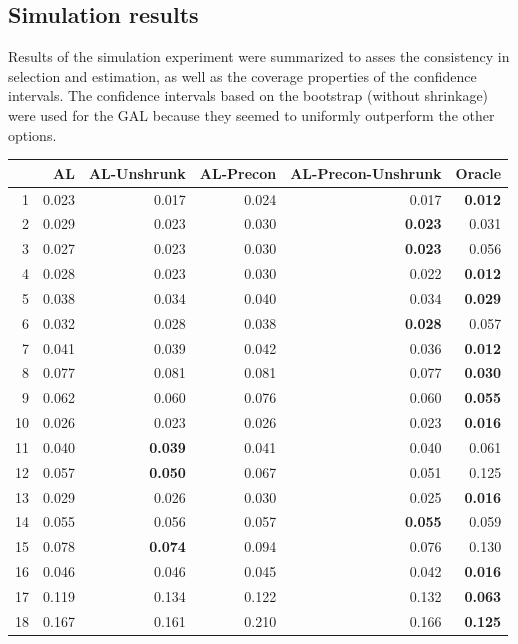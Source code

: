\documentclass[authoryear, review, 11pt]{elsarticle}
\begin{document}
	\subsection{Simulation results}
	Results of the simulation experiment were summarized to asses the consistency in selection and estimation, as well as the coverage properties of the confidence intervals. The confidence intervals based on the bootstrap (without shrinkage) were used for the GAL because they seemed to uniformly outperform the other options.\\
	
\begin{table}[ht]
\centering
\begin{tabular}{rrrrrr}
  \hline
 & AL & AL-Unshrunk & AL-Precon & AL-Precon-Unshrunk & Oracle \\ 
  \hline
1 & 0.023 & 0.017 & 0.024 & 0.017 & \textbf{0.012} \\ 
  2 & 0.029 & 0.023 & 0.030 & \textbf{0.023} & 0.031 \\ 
  3 & 0.027 & 0.023 & 0.030 & \textbf{0.023} & 0.056 \\ 
  4 & 0.028 & 0.023 & 0.030 & 0.022 & \textbf{0.012} \\ 
  5 & 0.038 & 0.034 & 0.040 & 0.034 & \textbf{0.029} \\ 
  6 & 0.032 & 0.028 & 0.038 & \textbf{0.028} & 0.057 \\ 
  7 & 0.041 & 0.039 & 0.042 & 0.036 & \textbf{0.012} \\ 
  8 & 0.077 & 0.081 & 0.081 & 0.077 & \textbf{0.030} \\ 
  9 & 0.062 & 0.060 & 0.076 & 0.060 & \textbf{0.055} \\ 
  10 & 0.026 & 0.023 & 0.026 & 0.023 & \textbf{0.016} \\ 
  11 & 0.040 & \textbf{0.039} & 0.041 & 0.040 & 0.061 \\ 
  12 & 0.057 & \textbf{0.050} & 0.067 & 0.051 & 0.125 \\ 
  13 & 0.029 & 0.026 & 0.030 & 0.025 & \textbf{0.016} \\ 
  14 & 0.055 & 0.056 & 0.057 & \textbf{0.055} & 0.059 \\ 
  15 & 0.078 & \textbf{0.074} & 0.094 & 0.076 & 0.130 \\ 
  16 & 0.046 & 0.046 & 0.045 & 0.042 & \textbf{0.016} \\ 
  17 & 0.119 & 0.134 & 0.122 & 0.132 & \textbf{0.063} \\ 
  18 & 0.167 & 0.161 & 0.210 & 0.166 & \textbf{0.125} \\ 
   \hline
\end{tabular}
\end{table}
\end{document}
